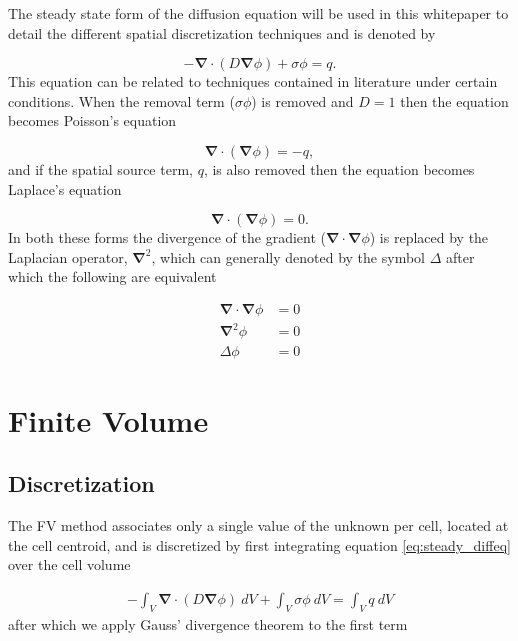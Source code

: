 \documentclass[11pt,letterpaper,titlepage]{article}
\newcommand{\bnabla}{\boldsymbol{\nabla}}
\numberwithin{equation}{section}
\begin{document}
The steady state form of the diffusion equation will be used in this whitepaper to detail the different spatial discretization techniques and is denoted by

\begin{equation} \label{eq:steady_diffeq}
-\bnabla \cdot (D\bnabla\phi) + \sigma \phi = q.
\end{equation}
\newline
This equation can be related to techniques contained in literature under certain conditions. When the removal term ($\sigma \phi$) is removed and $D{=}1$ then the equation becomes Poisson's equation 

\begin{equation} \label{eq:poisson_eq}
\bnabla \cdot (\bnabla\phi) = -q,
\end{equation}
\newline
and if the spatial source term, $q$, is also removed then the equation becomes Laplace's equation

\begin{equation} \label{eq:laplace_eq}
\bnabla \cdot (\bnabla\phi) = 0.
\end{equation}
\newline 
In both these forms the divergence of the gradient ($\bnabla\cdot\bnabla\phi$) is replaced by the Laplacian operator, $\bnabla^2$, which can generally denoted by the symbol $\Delta$ after which the following are equivalent 

\begin{equation}
\begin{aligned}
\bnabla\cdot\bnabla\phi &= 0 \\ 
\bnabla^2 \phi &=0 \\
 \Delta\phi &= 0
\end{aligned}
\end{equation} 


\newpage
{}
\section{Finite Volume}
\subsection{Discretization}
The FV method associates only a single value of the unknown per cell, located at the cell centroid, and is discretized by first integrating equation \eqref{eq:steady_diffeq} over the cell volume

\begin{equation}
\begin{aligned}
-\int_V \bnabla \cdot (D\bnabla\phi) \ dV + \int_V \sigma \phi \ dV = \int_V q \ dV
\end{aligned}
\end{equation}
\newline
after which we apply Gauss' divergence theorem to the first term
\end{document}
